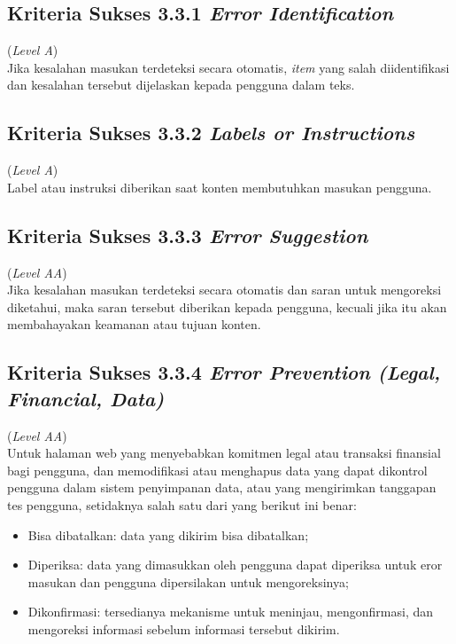 \subsection{Kriteria Sukses 3.3.1 \textit{Error Identification}}
\label{subsec:kriteria_3.3.1}
(\textit{Level A}) \\

Jika kesalahan masukan terdeteksi secara otomatis, \textit{item} yang salah diidentifikasi dan kesalahan tersebut dijelaskan kepada pengguna dalam teks.

\subsection{Kriteria Sukses 3.3.2 \textit{Labels or Instructions}}
\label{subsec:kriteria_3.3.2}
(\textit{Level A}) \\

Label atau instruksi diberikan saat konten membutuhkan masukan pengguna.

\subsection{Kriteria Sukses 3.3.3 \textit{Error Suggestion}}
\label{subsec:kriteria_3.3.3}
(\textit{Level AA}) \\

Jika kesalahan masukan terdeteksi secara otomatis dan saran untuk mengoreksi diketahui, maka saran tersebut diberikan kepada pengguna, kecuali jika itu akan membahayakan keamanan atau tujuan konten.

\subsection{Kriteria Sukses 3.3.4 \textit{Error Prevention (Legal, Financial, Data)}}
\label{subsec:kriteria_3.3.4}
(\textit{Level AA}) \\

Untuk halaman web yang menyebabkan komitmen legal atau transaksi finansial bagi pengguna, dan memodifikasi atau menghapus data yang dapat dikontrol pengguna dalam sistem penyimpanan data, atau yang mengirimkan tanggapan tes pengguna, setidaknya salah satu dari yang berikut ini benar:

\begin{itemize}
	\item Bisa dibatalkan: data yang dikirim bisa dibatalkan;
	\item Diperiksa: data yang dimasukkan oleh pengguna dapat diperiksa untuk eror masukan dan pengguna dipersilakan untuk mengoreksinya;
	\item Dikonfirmasi: tersedianya mekanisme untuk meninjau, mengonfirmasi, dan mengoreksi informasi sebelum informasi tersebut dikirim.
\end{itemize}


